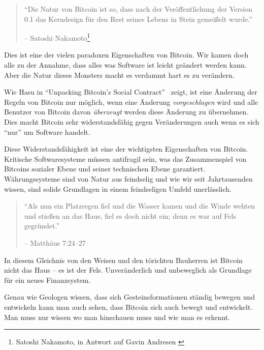 \begin{quotation}\begin{samepage}
\enquote{Die Natur von Bitcoin ist so, dass nach der Veröffentlichung der
Version 0.1 das Kerndesign für den Rest seines Lebens in Stein gemeißelt wurde.}
\begin{flushright} -- Satoshi Nakamoto\footnote{Satoshi Nakamoto, in  Antwort
auf Gavin Andresen \cite{satoshi-centralized-nature}}
\end{flushright}\end{samepage}\end{quotation}

Dies ist eine der vielen paradoxen Eigenschaften von Bitcoin. Wir kamen doch
alle zu der Annahme, dass alles was Software ist leicht geändert werden kann.
Aber die Natur dieses Monsters macht es verdammt hart es zu verändern.

Wie Hasu in \enquote{Unpacking Bitcoin’s Social Contract}~\cite{social-contract}
zeigt, ist eine Änderung der Regeln von Bitcoin nur möglich, wenn eine Änderung
\textit{vorgeschlagen} wird und alle Benutzer von Bitcoin davon
\textit{überzeugt} werden diese Änderung zu übernehmen. Dies macht Bitcoin sehr
widerstandsfähig gegen Veränderungen auch wenn es sich \enquote{nur} um Software
handelt.

Diese Widerstandsfähigkeit ist eine der wichtigsten Eigenschaften von Bitcoin.
Kritische Softwaresysteme müssen antifragil sein, was das Zusammenspiel von
Bitcoins sozialer Ebene und seiner technischen Ebene garantiert. Währungssysteme
sind von Natur aus feindselig und wie wir seit Jahrtausenden wissen, sind solide
Grundlagen in einem feindseligen Umfeld unerlässlich.

\begin{quotation}\begin{samepage}
\enquote{Als nun ein Platzregen fiel und die Wasser kamen und die Winde wehten
und stießen an das Haus, fiel es doch nicht ein; denn es war auf Fels
gegründet.}
\begin{flushright} -- Matthäus 7:24--27
\end{flushright}\end{samepage}\end{quotation}

In diesem Gleichnis von den Weisen und den törichten Bauherren ist Bitcoin nicht
das Haus -- es ist der Fels. Unveränderlich und unbeweglich als Grundlage für
ein neues Finanzsystem.

Genau wie Geologen wissen, dass sich Gesteinsformationen ständig bewegen und
entwickeln kann man auch sehen, dass Bitcoin sich auch bewegt und entwickelt.
Man muss nur wissen wo man hinschauen muss und wie man es erkennt.

